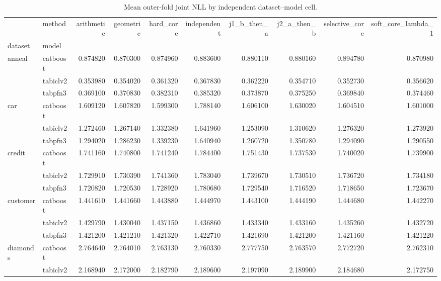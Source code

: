 \begin{table}
\caption{Mean outer-fold joint NLL by independent dataset--model cell.}
\label{tab:real_cells}
\begin{tabular}{llrrrrrrrr}
\toprule
 & method & arithmetic & geometric & hard\_core & independent & j1\_b\_then\_a & j2\_a\_then\_b & selective\_core & soft\_core\_lambda\_1 \\
dataset & model &  &  &  &  &  &  &  &  \\
\midrule
\multirow[t]{3}{*}{anneal} & catboost & 0.874820 & 0.870300 & 0.874960 & 0.883600 & 0.880110 & 0.880160 & 0.894780 & 0.870980 \\
 & tabiclv2 & 0.353980 & 0.354020 & 0.361320 & 0.367830 & 0.362220 & 0.354710 & 0.352730 & 0.356620 \\
 & tabpfn3 & 0.369100 & 0.370830 & 0.382310 & 0.385320 & 0.373870 & 0.375250 & 0.369840 & 0.374460 \\
\cline{1-10}
\multirow[t]{3}{*}{car} & catboost & 1.609120 & 1.607820 & 1.599300 & 1.788140 & 1.606100 & 1.630020 & 1.604510 & 1.601000 \\
 & tabiclv2 & 1.272460 & 1.267140 & 1.332380 & 1.641960 & 1.253090 & 1.310620 & 1.276320 & 1.273920 \\
 & tabpfn3 & 1.294020 & 1.286230 & 1.339230 & 1.640940 & 1.260720 & 1.350780 & 1.294090 & 1.290550 \\
\cline{1-10}
\multirow[t]{3}{*}{credit} & catboost & 1.741160 & 1.740800 & 1.741240 & 1.784400 & 1.751430 & 1.737530 & 1.740020 & 1.739900 \\
 & tabiclv2 & 1.729910 & 1.730390 & 1.741360 & 1.783040 & 1.739670 & 1.730510 & 1.736720 & 1.734180 \\
 & tabpfn3 & 1.720820 & 1.720530 & 1.728920 & 1.780680 & 1.729540 & 1.716520 & 1.718650 & 1.723670 \\
\cline{1-10}
\multirow[t]{3}{*}{customer} & catboost & 1.441610 & 1.441660 & 1.443880 & 1.444970 & 1.443100 & 1.444190 & 1.444680 & 1.442270 \\
 & tabiclv2 & 1.429790 & 1.430040 & 1.437150 & 1.436860 & 1.433340 & 1.433160 & 1.435260 & 1.432720 \\
 & tabpfn3 & 1.421200 & 1.421210 & 1.421320 & 1.422710 & 1.421690 & 1.421200 & 1.421160 & 1.421220 \\
\cline{1-10}
\multirow[t]{3}{*}{diamonds} & catboost & 2.764640 & 2.764010 & 2.763130 & 2.760330 & 2.777750 & 2.763570 & 2.772720 & 2.762310 \\
 & tabiclv2 & 2.168940 & 2.172000 & 2.182790 & 2.189600 & 2.197090 & 2.189900 & 2.184680 & 2.172750 \\

\end{tabular}
\end{table}

